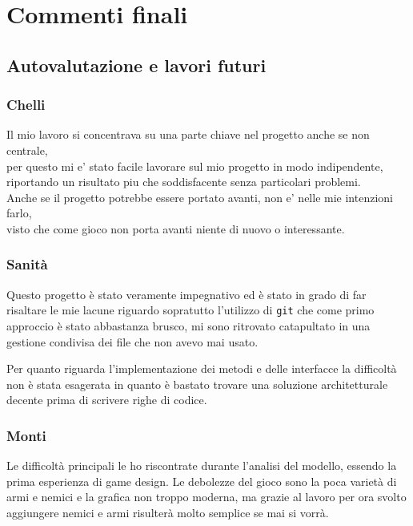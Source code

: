 \documentclass[a4paper,12pt]{report}
\begin{document}
    \chapter{Commenti finali}
    \section{Autovalutazione e lavori futuri}
    \subsection{Chelli}
    Il mio lavoro si concentrava su una parte chiave nel progetto anche se non centrale,\\
    per questo mi e' stato facile lavorare sul mio progetto in modo indipendente,\\
    riportando un risultato piu che soddisfacente senza particolari problemi.\\
    Anche se il progetto potrebbe essere portato avanti, non e' nelle mie intenzioni farlo,\\
    visto che come gioco non porta avanti niente di nuovo o interessante.\\
    \subsection{Sanità}
    \par Questo progetto è stato veramente impegnativo ed è stato in grado di far risaltare le mie lacune riguardo sopratutto l'utilizzo di \texttt{git} che come
    primo approccio è stato abbastanza brusco, mi sono ritrovato catapultato in una gestione condivisa dei file che non avevo mai usato.
    \par Per quanto riguarda l'implementazione dei metodi e delle interfacce la difficoltà non è stata esagerata in quanto è bastato trovare una soluzione
    architetturale decente prima di scrivere righe di codice.
    \subsection{Monti}
    Le difficoltà principali le ho riscontrate durante l'analisi del modello, essendo la prima esperienza di game design.
    Le debolezze del gioco sono la poca varietà di armi e nemici e la grafica non troppo moderna, ma grazie al lavoro per ora svolto
    aggiungere nemici e armi risulterà molto semplice se mai si vorrà.
\end{document}

